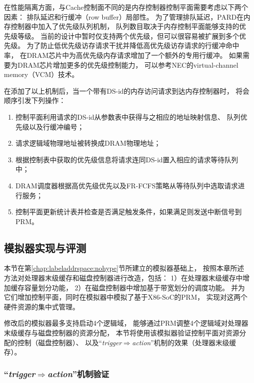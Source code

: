 在性能隔离方面，与Cache控制面不同的是内存控制器控制平面需要考虑以下两个因素：
排队延迟和行缓冲（row buffer）局部性。
为了管理排队延迟，PARD在内存控制器中加入了优先级队列机制，
队列数目取决于内存控制平面能够支持的优先级等级。
当前的设计中暂时仅支持两个优先级，但可以很容易被扩展到多个优先级。
为了防止低优先级访存请求干扰并降低高优先级访存请求的行缓冲命中率，
在DRAM芯片中为高优先级内存请求增加了一个额外的专用行缓冲。
如果需要为DRAM芯片增加更多的优先级控制能力，
可以参考NEC的virtual-channel memory（VCM）\cite{nec-vcm}技术。

在添加了以上机制后，当一个带有DS-id的内存访问请求到达内存控制器时，
将会顺序引发下列操作：

\begin{enumerate}[leftmargin=2\parindent, nolistsep, label=（\arabic*）]
  \item 控制平面利用请求的DS-id从参数表中获得与之相应的地址映射信息、
        队列优先级以及行缓冲编号；
  \item 请求逻辑域物理地址被转换成DRAM物理地址；
  \item 根据控制表中获取的优先级信息将请求连同DS-id置入相应的请求等待队列中；
  \item DRAM调度器根据高优先级优先以及FR-FCFS\cite{rixner_memory_2000}策略从等待队列中选取请求进行服务；
  \item 控制平面更新统计表并检查是否满足触发条件，如果满足则发送中断信号到PRM。
\end{enumerate}

\subsection{模拟器实现与评测}

本节在第\ref{chap:labeladdrspace:nohype}节所建立的模拟器基础上，
按照本章所述方法对处理器末级缓存和磁盘控制器进行改造，包括：
1）在处理器末级缓存中增加缓存容量划分功能，
2）在磁盘控制器中增加基于带宽划分的调度功能。
并为它们增加控制平面，同时在模拟器中模拟了基于X86-SoC的PRM，
实现对这两个硬件资源的集中式管理。

修改后的模拟器最多支持启动4个逻辑域，
能够通过PRM调整4个逻辑域对处理器末级缓存与磁盘控制器的资源分配，
本节将使用该模拟器验证控制平面对资源分配的控制（磁盘控制器）、
以及``\emph{trigger$\Rightarrow$action}''机制的效果（处理器末级缓存）。


\subsubsection{``\emph{trigger$\Rightarrow$action}''机制验证}

